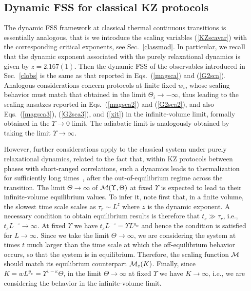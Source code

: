 \subsection{Dynamic FSS for classical KZ protocols}
\label{cfssoneway}

The dynamic FSS framework at classical thermal continuous transitions
is essentially analogous, that is we introduce the scaling variables
(\ref{KZscavar}) with the corresponding critical exponents, see
Sec.~\ref{classmod}. In particular, we recall that the dynamic
exponent associated with the purely relaxational dynamics is given by
$z=2.167(1)$. Then the dynamic FSS of the observables introduced
in Sec.~\ref{clobs} is the same as that reported in
Eqs.~(\ref{magsca}) and (\ref{G2sca}). Analogous considerations
concern protocols at finite fixed $w_i$, whose scaling behavior must
match that obtained in the limit $\Theta_i\to -\infty$, thus leading
to the scaling ansatzes reported in Eqs.~(\ref{magsca2}) and
(\ref{G2sca2}), and also Eqs.~(\ref{magsca3}), (\ref{G2sca3}), and
(\ref{xit}) in the infinite-volume limit, formally obtained in the
$\Upsilon\to 0$ limit. The adiabatic limit is analogously obtained by
taking the limit $\Upsilon\to\infty$.

However, further considerations apply to the classical system under
purely relaxational dynamics, related to the fact that, within KZ
protocols between phases with short-ranged correlations, such a
dynamics leads to thermalization for sufficiently long
times~\cite{Parisi-book}, after the out-of-equilibrium regime across the
transition.  The limit $\Theta\to\infty$ of ${\cal
  M}(\Upsilon,\Theta)$ at fixed $\Upsilon$ is expected to lead to
their infinite-volume equilibrium values.  To infer it, note first
that, in a finite volume, the slowest time scale scales as $\tau_r
\sim L^{z}$ where $z$ is the dynamic exponent. A necessary condition
to obtain equilibrium results is therefore that $t_s \gg \tau_r$,
i.e., $t_s L^{-z} \to \infty$. At fixed $\Upsilon$ we have $t_s L^{-z}
= \Upsilon L^{y_w}$ and hence the condition is satisfied for $L\to
\infty$. Since we take the limit $\Theta\to\infty$, we are considering
the system at times $t$ much larger than the time scale at which the
off-equilibrium behavior occurs, so that the system is in
equilibrium. Therefore, the scaling function ${\cal M}$ should match
its equilibrium counterpart ${\cal M}_e(K)$. Finally, since $K = w
L^{y_w} = \Upsilon^{1-\kappa}\Theta$, in the limit $\Theta\to\infty$
at fixed $\Upsilon$ we have $K \to \infty$, i.e., we are considering
the behavior in the infinite-volume limit.

